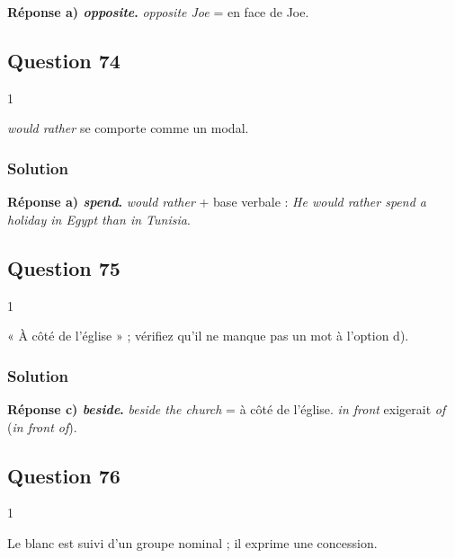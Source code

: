 \documentclass[11pt,a4paper]{article}
\begin{document}
\textbf{Réponse a) \emph{opposite}.} \emph{opposite Joe} = en face de Joe.

\hypertarget{question-74}{%
\subsection{Question 74}\label{question-74}}

\begin{indication}{1}

\emph{would rather} se comporte comme un modal.

\end{indication}

\hypertarget{solution-73}{%
\subsubsection{Solution}\label{solution-73}}

\textbf{Réponse a) \emph{spend}.} \emph{would rather} + base verbale : \emph{He would rather spend a holiday in Egypt than in Tunisia}.

\hypertarget{question-75}{%
\subsection{Question 75}\label{question-75}}

\begin{indication}{1}

« À côté de l'église » ; vérifiez qu'il ne manque pas un mot à l'option d).

\end{indication}

\hypertarget{solution-74}{%
\subsubsection{Solution}\label{solution-74}}

\textbf{Réponse c) \emph{beside}.} \emph{beside the church} = à côté de l'église. \emph{in front} exigerait \emph{of} (\emph{in front of}).

\hypertarget{question-76}{%
\subsection{Question 76}\label{question-76}}

\begin{indication}{1}

Le blanc est suivi d'un groupe nominal ; il exprime une concession.

\end{indication}
\end{document}
